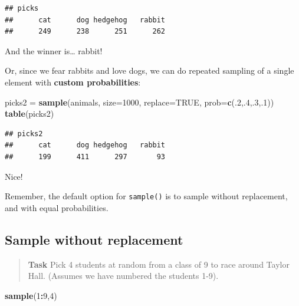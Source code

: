 \documentclass[
]{book}
\newenvironment{Shaded}{\begin{snugshade}}{\end{snugshade}}
\newcommand{\AttributeTok}[1]{\textcolor[rgb]{0.13,0.29,0.53}{#1}}
\newcommand{\ConstantTok}[1]{\textcolor[rgb]{0.56,0.35,0.01}{#1}}
\newcommand{\DecValTok}[1]{\textcolor[rgb]{0.00,0.00,0.81}{#1}}
\newcommand{\FunctionTok}[1]{\textcolor[rgb]{0.13,0.29,0.53}{\textbf{#1}}}
\newcommand{\NormalTok}[1]{#1}
\newcommand{\OtherTok}[1]{\textcolor[rgb]{0.56,0.35,0.01}{#1}}
\newcommand{\SpecialCharTok}[1]{\textcolor[rgb]{0.81,0.36,0.00}{\textbf{#1}}}
\theoremstyle{definition}
\theoremstyle{definition}
\theoremstyle{definition}
\theoremstyle{definition}
\theoremstyle{remark}
\begin{document}
\begin{verbatim}
## picks
##      cat      dog hedgehog   rabbit 
##      249      238      251      262
\end{verbatim}

And the winner is\ldots{} rabbit!

Or, since we fear rabbits and love dogs, we can do repeated sampling of a single element with \textbf{custom probabilities}:

\begin{Shaded}
\begin{Highlighting}[]
\NormalTok{picks2 }\OtherTok{=} \FunctionTok{sample}\NormalTok{(animals,}
                \AttributeTok{size=}\DecValTok{1000}\NormalTok{,}
                \AttributeTok{replace=}\ConstantTok{TRUE}\NormalTok{,}
                \AttributeTok{prob=}\FunctionTok{c}\NormalTok{(.}\DecValTok{2}\NormalTok{,.}\DecValTok{4}\NormalTok{,.}\DecValTok{3}\NormalTok{,.}\DecValTok{1}\NormalTok{))}
\FunctionTok{table}\NormalTok{(picks2)}
\end{Highlighting}
\end{Shaded}

\begin{verbatim}
## picks2
##      cat      dog hedgehog   rabbit 
##      199      411      297       93
\end{verbatim}

Nice!

Remember, the default option for \texttt{sample()} is to sample without replacement, and with equal probabilities.

\subsection*{Sample without replacement}\label{sample-without-replacement}

\begin{quote}
\textbf{Task}
Pick 4 students at random from a class of 9 to race around Taylor Hall. (Assumes we have numbered the students 1-9).
\end{quote}

\begin{Shaded}
\begin{Highlighting}[]
\FunctionTok{sample}\NormalTok{(}\DecValTok{1}\SpecialCharTok{:}\DecValTok{9}\NormalTok{,}\DecValTok{4}\NormalTok{)}
\end{Highlighting}
\end{Shaded}
\end{document}
